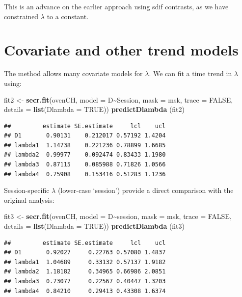 \documentclass[
]{book}
\newenvironment{Shaded}{\begin{snugshade}}{\end{snugshade}}
\newcommand{\AttributeTok}[1]{\textcolor[rgb]{0.13,0.29,0.53}{#1}}
\newcommand{\ConstantTok}[1]{\textcolor[rgb]{0.56,0.35,0.01}{#1}}
\newcommand{\FunctionTok}[1]{\textcolor[rgb]{0.13,0.29,0.53}{\textbf{#1}}}
\newcommand{\NormalTok}[1]{#1}
\newcommand{\OtherTok}[1]{\textcolor[rgb]{0.56,0.35,0.01}{#1}}
\newcommand{\SpecialCharTok}[1]{\textcolor[rgb]{0.81,0.36,0.00}{\textbf{#1}}}
\begin{document}
This is an advance on the earlier approach using sdif contrasts, as we have constrained \(\lambda\) to a constant.

\section{Covariate and other trend models}\label{covariate-and-other-trend-models}

The method allows many covariate models for \(\lambda\). We can fit a time trend in \(\lambda\) using:

\begin{Shaded}
\begin{Highlighting}[]
\NormalTok{ fit2  }\OtherTok{\textless{}{-}} \FunctionTok{secr.fit}\NormalTok{(ovenCH, }\AttributeTok{model =}\NormalTok{ D}\SpecialCharTok{\textasciitilde{}}\NormalTok{Session, }\AttributeTok{mask =}\NormalTok{ msk, }
     \AttributeTok{trace =} \ConstantTok{FALSE}\NormalTok{, }\AttributeTok{details =} \FunctionTok{list}\NormalTok{(}\AttributeTok{Dlambda =} \ConstantTok{TRUE}\NormalTok{))}
 \FunctionTok{predictDlambda}\NormalTok{ (fit2)}
\end{Highlighting}
\end{Shaded}

\begin{verbatim}
##         estimate SE.estimate     lcl    ucl
## D1       0.90131    0.212017 0.57192 1.4204
## lambda1  1.14738    0.221236 0.78899 1.6685
## lambda2  0.99977    0.092474 0.83433 1.1980
## lambda3  0.87115    0.085988 0.71826 1.0566
## lambda4  0.75908    0.153416 0.51283 1.1236
\end{verbatim}

Session-specific \(\lambda\) (lower-case `session') provide a direct comparison with the original analysis:

\begin{Shaded}
\begin{Highlighting}[]
\NormalTok{ fit3  }\OtherTok{\textless{}{-}} \FunctionTok{secr.fit}\NormalTok{(ovenCH, }\AttributeTok{model =}\NormalTok{ D}\SpecialCharTok{\textasciitilde{}}\NormalTok{session, }\AttributeTok{mask =}\NormalTok{ msk, }
     \AttributeTok{trace =} \ConstantTok{FALSE}\NormalTok{, }\AttributeTok{details =} \FunctionTok{list}\NormalTok{(}\AttributeTok{Dlambda =} \ConstantTok{TRUE}\NormalTok{))}
 \FunctionTok{predictDlambda}\NormalTok{ (fit3)}
\end{Highlighting}
\end{Shaded}

\begin{verbatim}
##         estimate SE.estimate     lcl    ucl
## D1       0.92027     0.22763 0.57080 1.4837
## lambda1  1.04689     0.33132 0.57137 1.9182
## lambda2  1.18182     0.34965 0.66986 2.0851
## lambda3  0.73077     0.22567 0.40447 1.3203
## lambda4  0.84210     0.29413 0.43308 1.6374
\end{verbatim}
\end{document}
